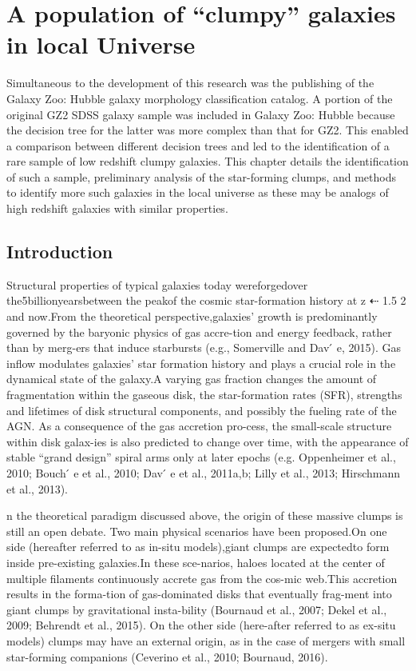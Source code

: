 
\chapter{A population of ``clumpy'' galaxies in local Universe}\label{chap:5}
Simultaneous to the development of this research was the publishing of the Galaxy Zoo: Hubble galaxy morphology classification catalog. A portion of the original GZ2 SDSS galaxy sample was included in Galaxy Zoo: Hubble because the decision tree for the latter was more complex than that for GZ2. This enabled a comparison between different decision trees and led to the identification of a rare sample of low redshift clumpy galaxies. This chapter details the identification of such a sample, preliminary analysis of the star-forming clumps, and methods to identify more such galaxies in the local universe as these may be analogs of high redshift galaxies with similar properties.


\section{Introduction}
Structural properties of typical galaxies today wereforgedover the5billionyearsbetween the peakof the cosmic star-formation history at z ⇠ 1.5  2 and now.From the theoretical perspective,galaxies’ growth is predominantly governed by the baryonic physics of gas accre-tion and energy feedback, rather than by merg-ers that induce starbursts (e.g., Somerville and Dav ́ e, 2015). Gas inflow modulates galaxies’ star formation history and plays a crucial role in the dynamical state of the galaxy.A varying gas fraction changes the amount of fragmentation within the gaseous disk, the star-formation rates (SFR), strengths and lifetimes of disk structural components, and possibly the fueling rate of the AGN. As a consequence of the gas accretion pro-cess, the small-scale structure within disk galax-ies is also predicted to change over time, with the appearance of stable “grand design” spiral arms only at later epochs (e.g. Oppenheimer et al., 2010; Bouch ́ e et al., 2010; Dav ́ e et al., 2011a,b; Lilly et al., 2013; Hirschmann et al., 2013). 

n the theoretical paradigm discussed above, the origin of these massive clumps is still an open debate. Two main physical scenarios have been proposed.On one side (hereafter referred to as in-situ models),giant clumps are expectedto form inside pre-existing galaxies.In these sce-narios, haloes located at the center of multiple filaments continuously accrete gas from the cos-mic web.This accretion results in the forma-tion of gas-dominated disks that eventually frag-ment into giant clumps by gravitational insta-bility (Bournaud et al., 2007; Dekel et al., 2009; Behrendt et al., 2015). On the other side (here-after referred to as ex-situ models) clumps may have an external origin, as in the case of mergers with small star-forming companions (Ceverino et al., 2010; Bournaud, 2016). 


